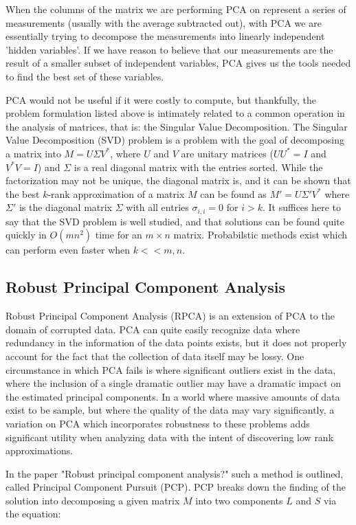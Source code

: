 \documentclass[11pt]{scrartcl} %
\theoremstyle{plain}
\begin{document}
When the columns of the matrix we are performing PCA on represent a series of measurements (usually with the average subtracted out), with PCA we are essentially trying to decompose the measurements into linearly independent 'hidden variables'. If we have reason to believe that our measurements are the result of a smaller subset of independent variables, PCA gives us the tools needed to find the best set of these variables.

PCA would not be useful if it were costly to compute, but thankfully, the problem formulation listed above is intimately related to a common operation in the analysis of matrices, that is: the Singular Value Decomposition. The Singular Value Decomposition (SVD) problem is a problem with the goal of decomposing a matrix into $M = U\Sigma V^*$, where $U$ and $V$ are unitary matrices ($UU^* = I$ and $V^*V = I$) and $\Sigma$ is a real diagonal matrix with the entries sorted. While the factorization may not be unique, the diagonal matrix is, and it can be shown that the best $k$-rank approximation of a matrix $M$ can be found as $M' = U \Sigma' V^*$ where $\Sigma'$ is the diagonal matrix $\Sigma$ with all entries $\sigma_{i,i} = 0$ for $i > k$. It suffices here to say that the SVD problem is well studied, and that solutions can be found quite quickly in $O(mn^2)$ time for an $m{\times}n$ matrix. Probabilstic methods exist which can perform even faster when $k << m, n$.

\subsection{Robust Principal Component Analysis}

Robust Principal Component Analysis (RPCA) \cite{pcp} is an extension of PCA to the domain of corrupted data. PCA can quite easily recognize data where redundancy in the information of the data points exists, but it does not properly account for the fact that the collection of data itself may be lossy. One circumstance in which PCA fails is where significant outliers exist in the data, where the inclusion of a single dramatic outlier may have a dramatic impact on the estimated principal components. In a world where massive amounts of data exist to be sample, but where the quality of the data may vary significantly, a variation on PCA which incorporates robustness to these problems adds significant utility when analyzing data with the intent of discovering low rank approximations.

In the paper "Robust principal component analysis?"\cite{pcp} such a method is outlined, called Principal Component Pursuit (PCP). PCP breaks down the finding of the solution into decomposing a given matrix $M$ into two components $L$ and $S$ via the equation:
\end{document}
